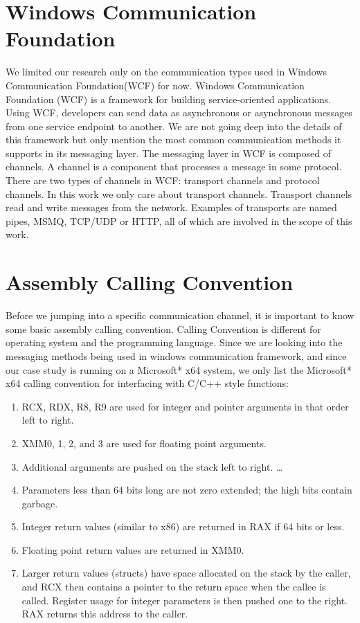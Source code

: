 \section{Windows Communication Foundation}
We limited our research only on the communication types used in Windows Communication Foundation(WCF) for now. Windows Communication Foundation (WCF) is a framework for building service-oriented applications. Using WCF, developers can send data as asynchronous or asynchronous messages from one service endpoint to another. We are not going deep into the details of this framework but only mention the most common communication methods it supports in its messaging layer. The messaging layer in WCF is composed of channels. A channel is a component that processes a message in some protocol. There are two types of channels in WCF: transport channels and protocol channels. In this work we only care about transport channels. Transport channels read and write messages from the network. Examples of transports are named pipes, MSMQ, TCP/UDP or HTTP, all of which are involved in the scope of this work.

\section{Assembly Calling Convention}
Before we jumping into a specific communication channel, it is important to know some basic assembly calling convention.
Calling Convention is different for operating system and the programming language. Since we are looking into the messaging methods being used in windows communication framework, and since our case study is running on a Microsoft* x64 system, we only list the Microsoft* x64 calling convention for interfacing with C/C++ style functions:\par
\begin{enumerate}  
\item RCX, RDX, R8, R9 are used for integer and pointer arguments in that order left to right.
\item XMM0, 1, 2, and 3 are used for floating point arguments.
\item Additional arguments are pushed on the stack left to right. \ldots 
\item Parameters less than 64 bits long are not zero extended; the high bits contain garbage.
\item Integer return values (similar to x86) are returned in RAX if 64 bits or less.
\item Floating point return values are returned in XMM0.
\item Larger return values (structs) have space allocated on the stack by the caller, and RCX then contains a pointer to the return space when the callee is called. Register usage for integer parameters is then pushed one to the right. RAX returns this address to the caller.
\end{enumerate}


